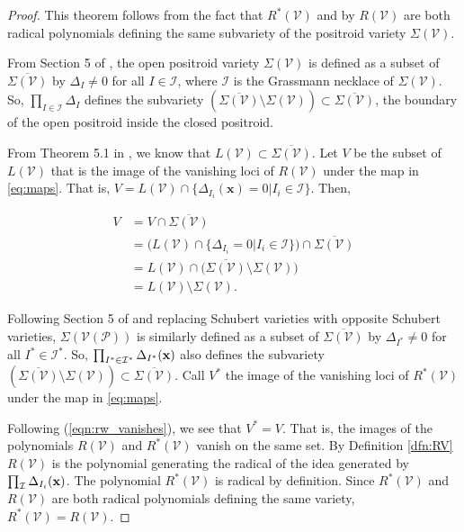 \documentclass[11pt]{article}
\newcommand{\cP}{\mathcal{P}}
\newcommand{\cV}{\mathcal{V}}
\newcommand{\VP}{\cV(\cP)}
\theoremstyle{remark}
\theoremstyle{definition}
\begin{document}
\begin{proof}
This theorem follows from the fact that $R^{\ast}(\cV)$ and by $R(\cV)$ are both radical polynomials defining the same subvariety of the positroid variety $\Sigma(\cV)$. 

From Section 5 of \cite{Juggling}, the open positroid variety $\Sigma(\cV)$ is defined as a subset of $\overline{\Sigma(\cV)}$ by $\Delta_I \neq 0$ for all $I \in \mathcal{I}$, where $\mathcal{I}$ is the Grassmann necklace of $\Sigma(\cV)$. So, $\prod_{I \in \mathcal{I}} \Delta_I$ defines the subvariety $(\overline{\Sigma(\cV)} \setminus \Sigma(\cV)) \subset \overline{\Sigma(\cV)}$, the boundary of the open positroid inside the closed positroid. 

From Theorem 5.1 in \cite{basisshapeloci}, we know that $L(\cV) \subset \overline{\Sigma(\cV)}$. Let $V$ be the subset of $L(\cV)$ that is the image of the vanishing loci of $R(\cV)$ under the map in \eqref{eq:maps}. That is, $V = L(\cV) \cap \{\Delta_{I_i}(\mathbf{x}) = 0 | I_i \in \mathcal{I}\}$. Then,

%
\begin{equation} \label{eqn:rw_vanishes}
\begin{split}
V & = V \cap \overline{\Sigma(\cV)} \\
& = \big(L(\cV) \cap \{\Delta_{I_i} = 0 |  I_i \in \mathcal{I}\}\big) \cap \overline{\Sigma(\cV)} \\
& = L(\cV) \cap \big(\overline{\Sigma(\cV)} \setminus \Sigma(\cV)\big) \\
& =  L(\cV) \setminus \Sigma(\cV).
\end{split}
\end{equation}

Following Section 5 of \cite{Juggling} and replacing Schubert varieties with opposite Schubert varieties, $\Sigma(\VP)$ is similarly defined as a subset of $\overline{\Sigma(\cV)}$ by $\Delta_{I^{\ast}} \neq 0$ for all $I^{\ast} \in \mathcal{I}^{\ast}$. So, $\prod_{I^{\ast} \in \mathcal{I}^{\ast}} \Delta_{I^{\ast}}(\bf{x})$ also defines the subvariety $(\overline{\Sigma(\cV)} \setminus \Sigma(\cV)) \subset \overline{\Sigma(\cV)}$. Call $V^\ast$ the image of the vanishing loci of $R^\ast(\cV)$ under the map in \eqref{eq:maps}.

Following (\ref{eqn:rw_vanishes}), we see that $V^* = V$. That is, the images of the polynomials $R(\cV)$ and $R^{\ast}(\cV)$ vanish on the same set. By Definition \ref{dfn:RV} $R(\cV)$ is the polynomial generating the radical of the idea generated by $\prod_\mathcal{I} \Delta_{I_i}(\bf{x})$. The polynomial $R^{\ast}(\cV)$ is radical by definition. Since  $R^{\ast}(\cV)$ and $R(\cV)$ are both radical polynomials defining the same variety, $R^{\ast}(\cV) = R(\cV)$. 
\end{proof}
\end{document}
